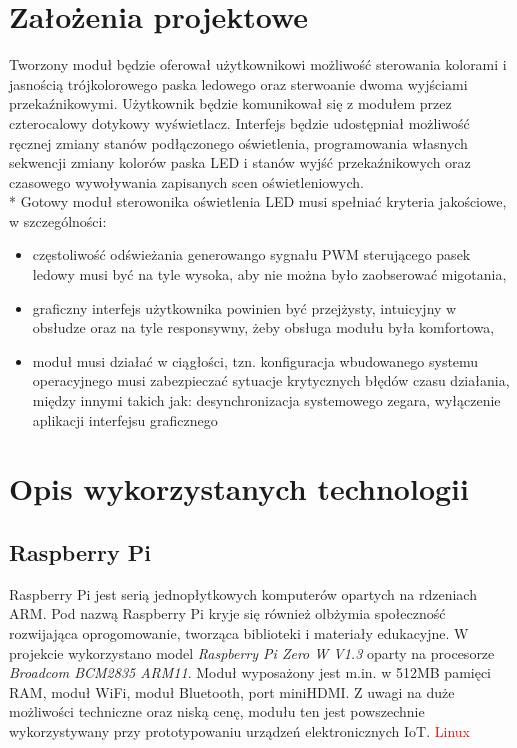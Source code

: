 \documentclass[12pt, eng, twoside, openany, final]{mgr}
\begin{document}
\chapter{Założenia projektowe}
\thispagestyle{fancy}  
    Tworzony moduł będzie oferował użytkownikowi możliwość sterowania kolorami i jasnością trójkolorowego paska ledowego oraz sterwoanie dwoma wyjściami przekaźnikowymi. Użytkownik będzie komunikował się z modułem przez czterocalowy dotykowy wyświetlacz. Interfejs będzie udostępniał możliwość ręcznej zmiany stanów podłączonego oświetlenia, programowania własnych sekwencji zmiany kolorów paska LED i stanów wyjść przekaźnikowych oraz czasowego wywoływania zapisanych scen oświetleniowych.\\*
    Gotowy moduł sterowonika oświetlenia LED musi spełniać kryteria jakościowe, w szczególności:
    \begin{itemize}
        \item częstoliwość odświeżania generowango sygnału PWM sterującego pasek ledowy musi być na tyle wysoka, aby nie można było zaobserować migotania,
        
        \item graficzny interfejs użytkownika powinien być przejżysty, intuicyjny w obsłudze oraz na tyle responsywny, żeby
        obsługa modułu była komfortowa,
        
        \item moduł musi działać w ciągłości, tzn. konfiguracja wbudowanego systemu operacyjnego musi zabezpieczać sytuacje
        krytycznych błędów czasu działania, między innymi takich jak: desynchronizacja systemowego zegara, wyłączenie aplikacji interfejsu graficznego
    \end{itemize}
%
\chapter{Opis wykorzystanych technologii}
\thispagestyle{fancy}
    \section{Raspberry Pi}
    Raspberry Pi jest serią jednopłytkowych komputerów opartych na rdzeniach ARM. Pod nazwą Raspberry Pi kryje się również olbżymia społeczność rozwijająca oprogomowanie, tworząca biblioteki i materiały edukacyjne.
    W projekcie wykorzystano model \emph{Raspberry Pi Zero W V1.3} oparty na procesorze  \emph{Broadcom BCM2835 ARM11}. Moduł wyposażony jest m.in. w 512MB pamięci RAM, moduł WiFi, moduł Bluetooth, port miniHDMI. Z uwagi na  duże możliwości techniczne oraz niską cenę, modułu ten jest powszechnie wykorzystywany przy prototypowaniu urządzeń elektronicznych IoT.
    \textcolor{red}{Linux}
    
\end{document}

